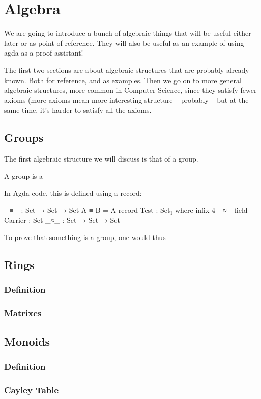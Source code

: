 \section{Algebra}
We are going to introduce a bunch of algebraic things that will be useful either later or as point of reference. They will also be useful as an example of using agda as a proof assistant!

The first two sections are about algebraic structures that are probably already known. Both for reference, and as examples. Then we go on to more general algebraic structures, more common in Computer Science, since they satisfy fewer axioms (more axioms mean more interesting structure -- probably -- but at the same time, it's harder to satisfy all the axioms.
\subsection{Groups}
The first algebraic structure we will discuss is that of a group.
\begin{Def}
A group is a 
\end{Def}

In Agda code, this is defined using a record:
\begin{code}
_≡_ : Set → Set → Set
A ≡ B = A
record Test : Set₁ where
  infix  4 _≈_
  field
    Carrier : Set
    _≈_     : Set → Set → Set
\end{code}
To prove that something is a group, one would thus
\subsection{Rings}
\subsubsection{Definition}
\subsubsection{Matrixes}
\subsection{Monoids}
\subsubsection{Definition}
\subsubsection{Cayley Table}
